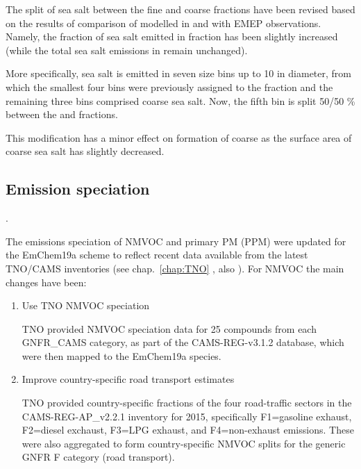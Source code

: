 The split of sea salt between the fine and coarse fractions have been revised based on the results of comparison of modelled  in \PM[2.5] and \PM[10] with EMEP observations. Namely, the fraction of sea salt emitted in \PM[2.5] fraction has been slightly increased (while the total sea salt emissions in \PM[10] remain unchanged). 

More specifically, sea salt is emitted in seven size bins up to 10 \um in diameter, from which the smallest four bins were previously assigned to the \PM[2.5] fraction and the remaining three bins comprised coarse sea salt. Now, the fifth bin is split 50/50 \% between the \PM[2.5] and \PM[2.5-10] fractions.  


This modification has a minor effect on formation of coarse \noiii as the surface area of coarse sea salt has slightly decreased.



\subsection{Emission speciation}
\label{ssec:emissplits}.


The emissions speciation of NMVOC and primary PM (PPM) were updated
for the EmChem19a scheme to reflect recent data available from
the latest TNO/CAMS inventories (see chap.~\ref{chap:TNO} 
, also
\citealt{CAMSemis2019}).  For NMVOC the main changes have been:

\begin{enumerate}
  \item Use TNO NMVOC speciation

    TNO provided NMVOC speciation data for 25 compounds from each
    GNFR\_CAMS category, as part of the CAMS-REG-v3.1.2 database,
    which were then mapped to the EmChem19a species.

  \item Improve country-specific road transport estimates

    TNO provided country-specific fractions of the four road-traffic
    sectors in the CAMS-REG-AP\_v2.2.1 inventory for 2015, specifically
    F1=gasoline exhaust, F2=diesel exchaust, F3=LPG exhaust, and
    F4=non-exhaust emissions. These were also aggregated to form
    country-specific NMVOC splits for the generic GNFR F category
    (road transport).

\end{enumerate}

